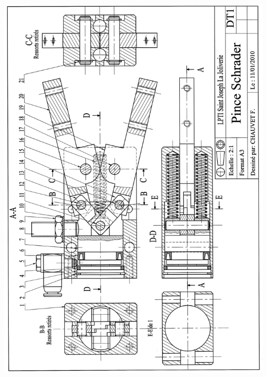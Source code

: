 \documentclass[10pt,fleqn]{article} %
\begin{document}
\begin{center}
\includegraphics[width=\linewidth]{images/plan}
\end{center}
\end{document}
